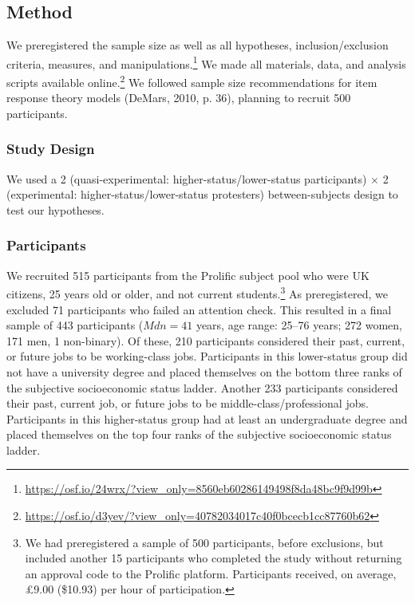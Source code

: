 \documentclass[twocolumn, 11pt, letterpaper]{article}
\begin{document}
\hypertarget{method}{%
\subsection{Method}\label{method}}

We preregistered the sample size as well as all hypotheses,
inclusion/exclusion criteria, measures, and manipulations.\footnote{\url{https://osf.io/24wrx/?view_only=8560eb60286149498f8da48bc9f9d99b}}
We made all materials, data, and analysis scripts available
online.\footnote{\url{https://osf.io/d3yev/?view_only=40782034017c40f0bcecb1cc87760b62}}
We followed sample size recommendations for item response theory models
(DeMars, 2010, p. 36), planning to recruit 500 participants.

\hypertarget{study-design}{%
\subsubsection{Study Design}\label{study-design}}

We used a 2 (quasi-experimental: higher-status/lower-status
participants) \(\times\) 2 (experimental: higher-status/lower-status
protesters) between-subjects design to test our hypotheses.

\hypertarget{participants}{%
\subsubsection{Participants}\label{participants}}

We recruited 515 participants from the Prolific subject pool who were UK
citizens, 25 years old or older, and not current students.\footnote{We
  had preregistered a sample of 500 participants, before exclusions, but
  included another 15 participants who completed the study without
  returning an approval code to the Prolific platform. Participants
  received, on average, \pounds 9.00 (\$10.93) per hour of
  participation.} As preregistered, we excluded 71 participants who
failed an attention check. This resulted in a final sample of 443
participants (\(\textit{Mdn} = 41\) years, age range: 25--76 years; 272
women, 171 men, 1 non-binary). Of these, 210 participants considered
their past, current, or future jobs to be working-class jobs.
Participants in this lower-status group did not have a university degree
and placed themselves on the bottom three ranks of the subjective
socioeconomic status ladder. Another 233 participants considered their
past, current job, or future jobs to be middle-class/professional jobs.
Participants in this higher-status group had at least an undergraduate
degree and placed themselves on the top four ranks of the subjective
socioeconomic status ladder.
\end{document}

